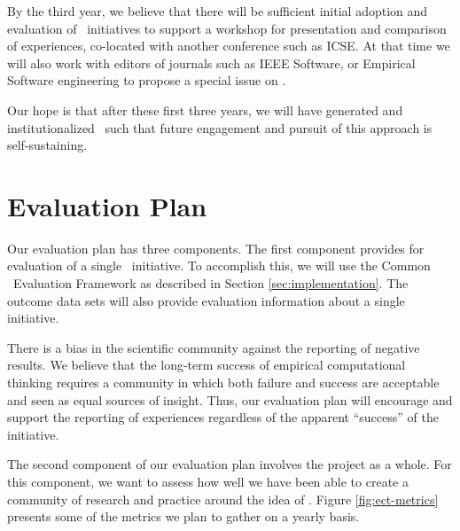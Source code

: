 By the third year, we believe that there will be sufficient
initial adoption and evaluation of \eCT\ initiatives to support a workshop
for presentation and comparison of experiences, co-located with another
conference such as ICSE.  At that time we will also work with editors of
journals such as IEEE Software, or Empirical Software engineering to
propose a special issue on \eCT.

Our hope is that after these first three years, we will have generated and 
institutionalized \eCT\ such that future engagement and pursuit of this 
approach is self-sustaining. 

\section{Evaluation Plan}



Our evaluation plan has three components.  The first component provides for
evaluation of a single \eCT\ initiative.  To accomplish this, we will use
the Common \eCT\ Evaluation Framework as described in Section
\ref{sec:implementation}.  The outcome data sets will also provide
evaluation information about a single initiative.

There is a bias in the scientific community against the reporting of
negative results.  We believe that the long-term success of empirical
computational thinking requires a community in which both failure and
success are acceptable and seen as equal sources of insight. Thus, our
evaluation plan will encourage and support the reporting of experiences
regardless of the apparent ``success'' of the initiative.

The second component of our evaluation plan involves the project as a
whole.  For this component, we want to assess how well we have been able
to create a community of research and practice around
the idea of \eCT.  Figure \ref{fig:ect-metrics} presents some of the
metrics we plan to gather on a yearly basis.

